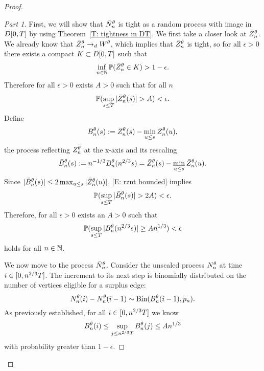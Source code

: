 \begin{proof}
\begin{proof}[Part 1]\renewcommand{\qedsymbol}{}
First, we will show that $\bar{N}_n^{\theta}$ is tight as a random process with image in $D[0, T]$ by using Theorem~\ref{T: tightness in DT}.
We first take a closer look at $\bar{Z}^{\theta}_n$.
We already know that $\bar{Z}^{\theta}_n \rightarrow_d W^{\theta}$, which implies that $\bar{Z}^{\theta}_n$ is tight, 
so for all $\epsilon>0$ there exists a compact $K \subset D[0, T]$ such that
\begin{equation} \label{E: rznt tight}
\inf_{n \in \mathbb{N}}\mathbb{P} ( \bar{Z}^{\theta}_n \in K) > 1 - \epsilon.
\end{equation}
Therefore for all $\epsilon > 0$ exists $A>0$ such that for all $n$
\begin{equation} \label{E: rznt bounded}
\mathbb{P}(\sup_{s \leq T} |\bar{Z}^{\theta}_n(s)| > A) < \epsilon.
\end{equation}
Define 
\begin{equation}
	B_n^{\theta}(s) := Z_n^{\theta}(s) - \min_{u \leq s}Z_n^{\theta}(u),
\end{equation}
the process reflecting $Z_n^{\theta}$ at the x-axis and its rescaling
\begin{equation}
	\bar{B}_n^{\theta}(s) := n^{-1 / 3}B_n^{\theta}(n^{2 / 3}s) = \bar{Z}^{\theta}_n(s) - \min_{u \leq s}\bar{Z}^{\theta}_n(u).
\end{equation}
Since $|\bar{B}_n^{\theta}(s)| \leq 2\max_{u \leq s}|\bar{Z}^{\theta}_n(u)|$, \eqref{E: rznt bounded} implies
\begin{equation} \label{E: rzminz bounded}
\mathbb{P}(\sup_{s \leq T} |\bar{B}_n^{\theta}(s)| > 2A) < \epsilon.
\end{equation}
Therefore, for all $\epsilon > 0$ exists an $A>0$ such that
\begin{equation}
\mathbb{P}( \sup_{s \leq T} |B_n^{\theta}(n^{2 / 3}s)| \geq An^{1 / 3} ) < \epsilon
\end{equation}
holds for all $n \in \mathbb{N}$.

\bigskip

We now move to the process $\bar{N}_n^{\theta}$. Consider the unscaled process $N_n^{\theta}$ at time $i \in [0, n^{2 / 3}T]$.
The increment to its next step is binomially distributed on the number of vertices eligible for a surplus edge:
\begin{equation}
N_n^{\theta}(i) - N_n^{\theta}(i-1) \sim \operatorname*{Bin}(B_n^{\theta}(i-1), p_n).
\end{equation}
As previously established, for all $i \in [0, n^{2 / 3}T]$ we know 
\begin{equation}
	B_n^{\theta}(i) \leq \sup_{j \leq n^{2 / 3}T} B_n^{\theta}(j) \leq An^{1 / 3}
\end{equation}
with probability greater than $1-\epsilon$.


\end{proof}
\end{proof}
